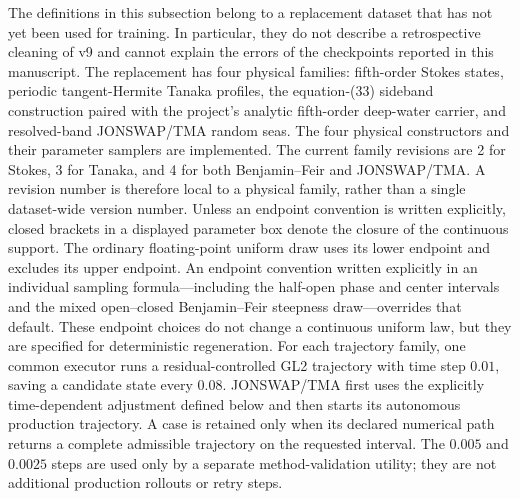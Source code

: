 The definitions in this subsection belong to a replacement dataset that has
not yet been used for training.  In particular, they do not describe a
retrospective cleaning of v9 and cannot explain the errors of the checkpoints
reported in this manuscript.  The replacement has four physical families:
fifth-order Stokes states, periodic tangent-Hermite Tanaka profiles, the
equation-(33) sideband construction paired with the project's analytic
fifth-order deep-water carrier, and resolved-band JONSWAP/TMA random seas.
The four physical constructors and their parameter samplers are implemented.
The current family revisions are 2 for Stokes, 3 for Tanaka, and 4 for both
Benjamin--Feir and JONSWAP/TMA.  A revision number is therefore local
to a physical family, rather than a single dataset-wide version number.
Unless an endpoint convention is written explicitly, closed brackets in a
displayed parameter box denote the closure of the continuous support.  The
ordinary floating-point uniform draw uses its lower endpoint and excludes its
upper endpoint.  An endpoint convention written explicitly in an individual
sampling formula---including the half-open phase and center intervals and the
mixed open--closed Benjamin--Feir steepness draw---overrides that default.
These endpoint choices do not change a continuous uniform law, but they are
specified for deterministic regeneration.
For each trajectory family, one common executor runs a
residual-controlled GL2 trajectory with time step \(0.01\), saving a
candidate state every \(0.08\).  JONSWAP/TMA first uses the explicitly
time-dependent adjustment defined below and then starts its autonomous
production trajectory.  A case is retained only when its declared numerical
path returns a complete admissible trajectory on the requested interval.  The
\(0.005\) and \(0.0025\) steps are used only by a separate method-validation
utility; they are not additional production rollouts or retry steps.

